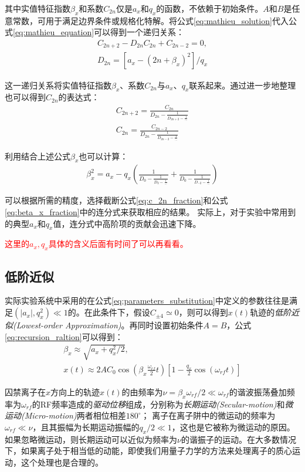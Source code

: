 其中实值特征指数$\beta_x$和系数$C_{2n}$仅是$a_x$和$q_x$的函数，不依赖于初始条件。$A$和$B$是任意常数，可用于满足边界条件或规格化特解。将公式\eqref{eq:mathieu_solution}代入公式\eqref{eq:mathieu_equation}可以得到一个递归关系：
\begin{align}
    C_{2n+2}-D_{2n}C_{2n}+C_{2n-2}=0,\\
    D_{2n}=[a_x-(2n+\beta_x)^2]/q_x\label{eq:recursion_raltion}
\end{align}

这一递归关系将实值特征指数$\beta_x$、系数$C_{2n}$与$a_x$、$q_x$联系起来。通过进一步地整理也可以得到$C_{2n}$的表达式：
\begin{align}
    C_{2n+2}=\frac{C_{2n}}{D_{2n}-\frac{1}{D_{2n+2}-\frac{1}{\dots}}}\\
    C_{2n}=\frac{C_{2n-2}}{D_{2n}-\frac{1}{D_{2n-2}-\frac{1}{\dots}}}\label{eq:c_2n_fraction}
\end{align}

利用结合上述公式$\beta_x$也可以计算：
\begin{align}
    \beta_x^2=a_x-q_x\left(\frac{1}{D_0-\frac{1}{D_2-\frac{1}{\dots}}} + \frac{1}{D_0-\frac{1}{D_{-2}-\frac{1}{\dots}}}\right) \label{eq:beta_x_fraction}
\end{align}

可以根据所需的精度，选择截断公式\eqref{eq:c_2n_fraction}和公式\eqref{eq:beta_x_fraction}中的连分式来获取相应的结果。
实际上，对于实验中常用到的典型$a_x$和$q_x$值，连分式中高阶项的贡献会迅速下降。

\textcolor{red}{这里的$a_x, q_x$具体的含义后面有时间了可以再看看。}
\subsection[低阶近似]{低阶近似\label{section:lowest_order_approximation}}
实际实验系统中采用的在公式\eqref{eq:parameters_substitution}中定义的参数往往是满足$(|a_x|,q_x^2)\ll 1$的。在此条件下，假设$C_{\pm 4}\simeq 0$，则可以得到$x(t)$轨迹的\emph{低阶近似(Lowest-order Approximation)}。再同时设置初始条件$A=B$，公式\ref{eq:recursion_raltion}可以得到：
\begin{align}
    \beta_x\approx \sqrt{a_x+q_x^2/2},\\
    x(t)\approx2AC_0\cos\left(\beta_x\frac{\omega_{rf}}{2}t\right)\left[1-\frac{q_x}{2}\cos(\omega_{rf}t)\right]\label{eq:classical_motion_solution}
\end{align}

囚禁离子在$x$方向上的轨迹$x(t)$的由频率为$\nu=\beta_x\omega_{rf}/2\ll \omega_{rf}$的谐波振荡叠加频率为$\omega_{rf}$的RF频率造成的\emph{驱动位移}组成，分别称为\emph{长期运动(Secular-motion)}和\emph{微运动(Micro-motion)}两者相位相差$180^\circ$；
离子在离子阱中的微运动的频率为$\omega_{rf}\ll \nu$，且其振幅为长期运动振幅的$q_x/2\ll 1$，这也是它被称为微运动的原因。如果忽略微运动，则长期运动可以近似为频率为$\nu$的谐振子的运动。在大多数情况下，如果离子处于相当低的动能，即使我们用量子力学的方法来处理离子的质心运动，这个处理也是合理的。


